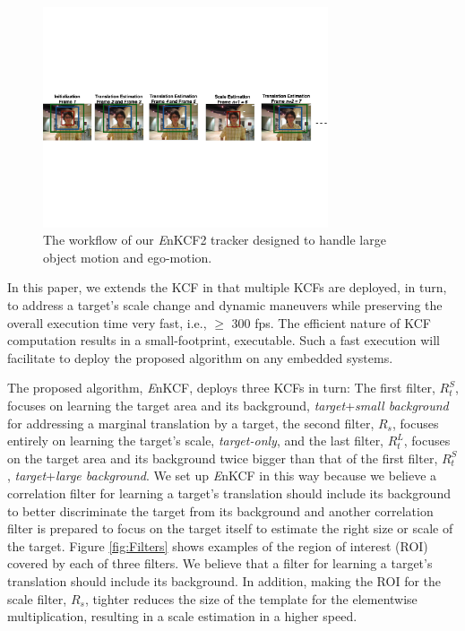 \documentclass{bmvc2k}
\begin{document}
\begin{figure}[!t]
\centering
\includegraphics[width=0.75\textwidth]{figures/Workflow_EnKCF2+PF.pdf}
\caption{The workflow of our {\it E}nKCF2 tracker designed to handle large object motion and ego-motion.}
\label{Workflow_figure_EnKCF2}
\end{figure}

In this paper, we extends the KCF in that multiple KCFs are deployed,
in turn, to address a target's scale change and dynamic maneuvers
while preserving the overall execution time very fast, i.e., $\ge$ 300
fps. The efficient nature of KCF computation results in a
small-footprint, executable. Such a fast execution will facilitate to
deploy the proposed algorithm on any embedded systems.

The proposed algorithm, {\it E}nKCF, deploys three KCFs in turn: The
first filter, $R_{t}^{S}$, focuses on learning the target area and its
background, \textit{target}+\textit{small background} for addressing a
marginal translation by a target, the second filter, $R_{s}$, focuses
entirely on learning the target's scale, \textit{target-only}, and the
last filter, $R_{t}^{L}$, focuses on the target area and its
background twice bigger than that of the first filter, $R_{t}^{S}$,
\textit{target}+\textit{large background}. We set up {\it E}nKCF in
this way because we believe a correlation filter for learning a
target's translation should include its background to better
discriminate the target from its background and another correlation
filter is prepared to focus on the target itself to estimate the right
size or scale of the target. Figure \ref{fig:Filters} shows examples
of the region of interest (ROI) covered by each of three filters. We
believe that a filter for learning a target's translation should
include its background. In addition, making the ROI for the scale
filter, $R_{s}$, tighter reduces the size of the template for the
elementwise multiplication, resulting in a scale estimation in a
higher speed.
\end{document}
